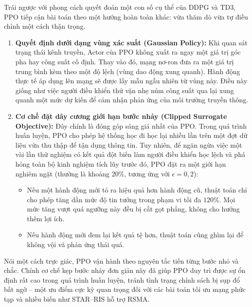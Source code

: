 
Trái ngược với phong cách quyết đoán một con số cụ thể của DDPG và TD3, PPO tiếp cận bài toán theo một
hướng hoàn toàn khác: vừa thăm dò vừa tự điều chỉnh một cách thận trọng.
\begin{enumerate}
\item \textbf{Quyết định dưới dạng vùng xác suất (Gaussian Policy):} Khi quan sát trạng thái kênh truyền,
  Actor của PPO không xuất ra ngay một giá trị góc pha hay công suất cố định. Thay vào đó, mạng nơ-ron đưa
  ra một giá trị trung bình kèm theo một độ lệch (vùng dao động xung quanh). Hành động thực tế áp dụng lên
  mạng sẽ được lấy mẫu ngẫu nhiên từ vùng này. Điều này giống như việc người điều khiển thử vặn nhẹ núm công
  suất qua lại xung quanh một mức dự kiến để cảm nhận phản ứng của môi trường truyền thông.
\item \textbf{Cơ chế đặt dây cương giới hạn bước nhảy (Clipped Surrogate Objective):} Đây chính là đóng
  góp sáng giá nhất của PPO. Trong quá trình huấn luyện, PPO cho phép hệ thống học đi học lại nhiều lần trên
  một đợt dữ liệu vừa thu thập để tận dụng thông tin. Tuy nhiên, để ngăn ngừa việc một vài lần thử nghiệm
  có kết quả đột biến làm người điều khiển học lệch và phá hỏng toàn bộ kinh nghiệm tích lũy trước đó, PPO
  đặt ra một giới hạn nghiêm ngặt (thường là khoảng $20\%$, tương ứng với $\epsilon = 0,2$):
  \begin{itemize}
  \item Nếu một hành động mới tỏ ra hiệu quả hơn hành động cũ, thuật toán chỉ cho phép tăng dần mức độ tin
    tưởng trong phạm vi tối đa $120\%$. Mọi mức tăng vượt quá ngưỡng này đều bị cắt gọt phẳng, không cho
    hưởng thêm lợi ích.
  \item Nếu hành động mới đem lại kết quả tệ hơn, thuật toán cũng ghìm lại để không vội vã phản ứng thái quá.
  \end{itemize}
\end{enumerate}
Nói một cách trực giác, PPO vận hành theo nguyên tắc tiến từng bước nhỏ và chắc. Chính cơ chế kẹp bước
nhảy đơn giản này đã giúp PPO duy trì được sự ổn định rất cao trong quá trình huấn luyện, tránh tình trạng
chính sách bị sụp đổ bất ngờ -- một ưu điểm cực kỳ quan trọng đối với các bài toán tối ưu mạng phức tạp và
nhiều biến như STAR--RIS hỗ trợ RSMA.

